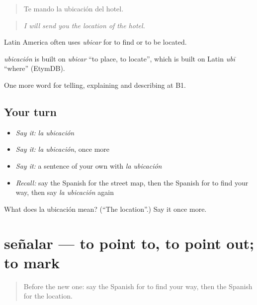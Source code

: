 \begin{quote}
Te mando la ubicación del hotel.
\end{quote}

\begin{quote}
\emph{I will send you the location of the hotel.}
\end{quote}

Latin America often uses \emph{ubicar} for to find or to be located.

\begin{cousinweb}
\emph{ubicación} is built on \emph{ubicar} \textquotedblleft{}to place, to locate\textquotedblright{}, which is built on Latin \emph{ubī} \textquotedblleft{}where\textquotedblright{} (EtymDB).
\end{cousinweb}

\begin{grammarlens}[title={What you've built}]
One more word for telling, explaining and describing at B1.
\end{grammarlens}

\subsection*{Your turn}
\begin{itemize}
\raggedright
  \item \emph{Say it:} \emph{la ubicación}
  \item \emph{Say it:} \emph{la ubicación}, once more
  \item \emph{Say it:} a sentence of your own with \emph{la ubicación}
  \item \emph{Recall:} say the Spanish for the street map, then the Spanish for to find your way, then say \emph{la ubicación} again
\end{itemize}

\begin{tcolorbox}[breakable,colback=teal!4,colframe=teal!35!black,title={Before you move on}]
What does la ubicación mean? (\textquotedblleft{}The location\textquotedblright{}.) Say it once more.
\end{tcolorbox}
\section[señalar]{señalar — to point to, to point out; to mark}

\label{lesson:ES-C669-senalar}



\begin{quote}
Before the new one: say the Spanish for to find your way, then the Spanish for the location.
\end{quote}

